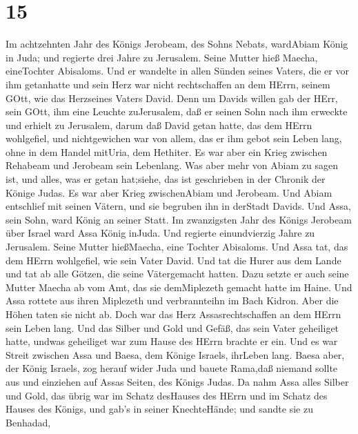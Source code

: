 \hypertarget{section-14}{%
\section{15}\label{section-14}}

 Im achtzehnten Jahr des Königs Jerobeam, des Sohns Nebats,
wardAbiam König in Juda;  und regierte drei Jahre zu
Jerusalem. Seine Mutter hieß Maecha, eineTochter Abisaloms. 
Und er wandelte in allen Sünden seines Vaters, die er vor ihm getanhatte
und sein Herz war nicht rechtschaffen an dem HErrn, seinem GOtt, wie das
Herzseines Vaters David.  Denn um Davids willen gab der
HErr, sein GOtt, ihm eine Leuchte zuJerusalem, daß er seinen Sohn nach
ihm erweckte und erhielt zu Jerusalem,  darum daß David
getan hatte, das dem HErrn wohlgefiel, und nichtgewichen war von allem,
das er ihm gebot sein Leben lang, ohne in dem Handel mitUria, dem
Hethiter.  Es war aber ein Krieg zwischen Rehabeam und
Jerobeam sein Lebenlang.  Was aber mehr von Abiam zu sagen
ist, und alles, was er getan hat;siehe, das ist geschrieben in der
Chronik der Könige Judas. Es war aber Krieg zwischenAbiam und Jerobeam.
 Und Abiam entschlief mit seinen Vätern, und sie begruben
ihn in derStadt Davids. Und Assa, sein Sohn, ward König an seiner Statt.
 Im zwanzigsten Jahr des Königs Jerobeam über Israel ward
Assa König inJuda.  Und regierte einundvierzig Jahre zu
Jerusalem. Seine Mutter hießMaecha, eine Tochter Abisaloms.
 Und Assa tat, das dem HErrn wohlgefiel, wie sein Vater
David.  Und tat die Hurer aus dem Lande und tat ab alle
Götzen, die seine Vätergemacht hatten.  Dazu setzte er auch
seine Mutter Maecha ab vom Amt, das sie demMiplezeth gemacht hatte im
Haine. Und Assa rottete aus ihren Miplezeth und verbrannteihn im Bach
Kidron.  Aber die Höhen taten sie nicht ab. Doch war das
Herz Assasrechtschaffen an dem HErrn sein Leben lang.  Und
das Silber und Gold und Gefäß, das sein Vater geheiliget hatte, undwas
geheiliget war zum Hause des HErrn brachte er ein.  Und es
war Streit zwischen Assa und Baesa, dem Könige Israels, ihrLeben lang.
 Baesa aber, der König Israels, zog herauf wider Juda und
bauete Rama,daß niemand sollte aus und einziehen auf Assas Seiten, des
Königs Judas.  Da nahm Assa alles Silber und Gold, das
übrig war im Schatz desHauses des HErrn und im Schatz des Hauses des
Königs, und gab's in seiner KnechteHände; und sandte sie zu Benhadad,
